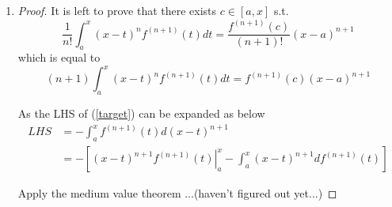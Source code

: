 \documentclass[paper=a4, fontsize=11pt]{scrartcl} %
\numberwithin{equation}{section} %
\numberwithin{figure}{section} %
\numberwithin{table}{section} %
\begin{document}
\begin{enumerate}
		\item 
			\begin{proof}
				It is left to prove that there exists $c\in [a, x]$ s.t. 
				\begin{equation}
					\frac{1}{n!}\int_{a}^{x} (x-t)^{n} f^{(n+1)}(t) dt = \frac{f^{(n+1)}(c)}{(n+1)!}(x-a)^{n+1}
				\end{equation}
				which is equal to 
				\begin{equation}
					(n+1)\int_{a}^{x} (x-t)^{n} f^{(n+1)}(t) dt = f^{(n+1)}(c)(x-a)^{n+1} \label{target}
				\end{equation}
				
				As the LHS of (\ref{target}) can be expanded as below
				\begin{equation}
					\begin{aligned}
						LHS & = - \int_{a}^{x}f^{(n+1)}(t) d(x-t)^{n+1}\\
							   & = - [\left. (x-t)^{n+1}f^{(n+1)}(t)\right|_{a}^{x} - \int_{a}^{x}(x-t)^{n+1}df^{(n+1)}(t)]
					\end{aligned}
				\end{equation}
				
				Apply the medium value theorem ...(haven't figured out yet...)
				
			\end{proof}
		
	\end{enumerate}


\end{document}
